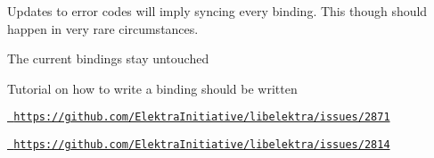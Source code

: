 \begin{DoxyItemize}
\item Updates to error codes will imply syncing every binding. This though should happen in very rare circumstances.
\end{DoxyItemize}


\begin{DoxyItemize}
\item The current bindings stay untouched
\item Tutorial on how to write a binding should be written
\end{DoxyItemize}


\begin{DoxyItemize}
\item \href{https://github.com/ElektraInitiative/libelektra/issues/2871}{\texttt{ https\+://github.\+com/\+Elektra\+Initiative/libelektra/issues/2871}}
\item \href{https://github.com/ElektraInitiative/libelektra/issues/2814}{\texttt{ https\+://github.\+com/\+Elektra\+Initiative/libelektra/issues/2814}} 
\end{DoxyItemize}